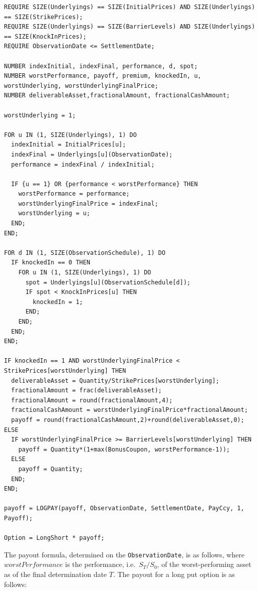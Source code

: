 \begin{listing}[hbt]
\begin{verbatim}
REQUIRE SIZE(Underlyings) == SIZE(InitialPrices) AND SIZE(Underlyings) == SIZE(StrikePrices);
REQUIRE SIZE(Underlyings) == SIZE(BarrierLevels) AND SIZE(Underlyings) == SIZE(KnockInPrices);
REQUIRE ObservationDate <= SettlementDate;

NUMBER indexInitial, indexFinal, performance, d, spot;
NUMBER worstPerformance, payoff, premium, knockedIn, u, worstUnderlying, worstUnderlyingFinalPrice;
NUMBER deliverableAsset,fractionalAmount, fractionalCashAmount;

worstUnderlying = 1;

FOR u IN (1, SIZE(Underlyings), 1) DO
  indexInitial = InitialPrices[u];
  indexFinal = Underlyings[u](ObservationDate);
  performance = indexFinal / indexInitial;

  IF {u == 1} OR {performance < worstPerformance} THEN
    worstPerformance = performance;
    worstUnderlyingFinalPrice = indexFinal;
    worstUnderlying = u;
  END;
END;

FOR d IN (1, SIZE(ObservationSchedule), 1) DO
  IF knockedIn == 0 THEN
    FOR u IN (1, SIZE(Underlyings), 1) DO
      spot = Underlyings[u](ObservationSchedule[d]);
      IF spot < KnockInPrices[u] THEN
        knockedIn = 1;
      END;
    END;
  END;
END;

IF knockedIn == 1 AND worstUnderlyingFinalPrice < StrikePrices[worstUnderlying] THEN
  deliverableAsset = Quantity/StrikePrices[worstUnderlying];
  fractionalAmount = frac(deliverableAsset);
  fractionalAmount = round(fractionalAmount,4);
  fractionalCashAmount = worstUnderlyingFinalPrice*fractionalAmount;
  payoff = round(fractionalCashAmount,2)+round(deliverableAsset,0);
ELSE
  IF worstUnderlyingFinalPrice >= BarrierLevels[worstUnderlying] THEN
    payoff = Quantity*(1+max(BonusCoupon, worstPerformance-1));
  ELSE
    payoff = Quantity;
  END;
END;

payoff = LOGPAY(payoff, ObservationDate, SettlementDate, PayCcy, 1, Payoff);

Option = LongShort * payoff;
\end{verbatim}
\caption{Payoff script for a WorstPerformanceRainbowOption06.}
\label{lst:worst_performance_rainbow_option_06}
\end{listing}

The payout formula, determined on the \lstinline!ObservationDate!, is as follows, where
$worstPerformance$ is the performance, i.e.\ $S_T/S_0$, of the worst-performing asset as
of the final determination date $T$. The payout for a long put option is as follows:

